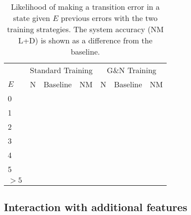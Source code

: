 \documentclass[11pt,letterpaper]{article}
\begin{document}
\begin{table}
    \small
    \centering
    \begin{tabular}{l|rrr|rrr}
        & \multicolumn{3}{c|}{Standard Training} & \multicolumn{3}{c}{G\&N Training}\\
        $E$   & N & Baseline & NM    & N &Baseline & NM    \\
        \hline \hline
        0     &   &          &        &   &       &        \\
        1     &   &          &        &   &       &        \\
        2     &   &          &        &   &       &        \\
        3     &   &          &        &   &       &        \\
        4     &   &          &        &   &       &        \\
        5     &   &          &        &   &       &        \\
        $>5$  &   &          &        &   &       &        \\
        \hline
    \end{tabular}
\caption{\small Likelihood of making a transition error in a state given $E$ previous
         errors with the two training strategies. The system accuracy (NM L+D) is
     shown as a difference from the baseline.\label{tab:errprop}}
\end{table}

\subsection{Interaction with additional features}
\end{document}
